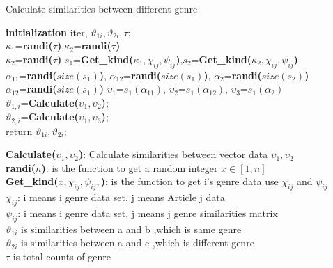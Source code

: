 \documentclass{article}
\begin{document}

\begin{algorithm}[H]
    \caption{Calculate similarities between different genre} %
    \textbf{initialization} iter, $\vartheta_{1i}, \vartheta_{2i}, \tau$; \\
    {
        $\kappa_{1}$=\textbf{randi($\tau$)},$\kappa_{2}$=\textbf{randi($\tau$)}\\
        {
            $\kappa_{2}$=\textbf{randi($\tau$)}
        }
        $s_{1}$=\textbf{Get\_kind($\kappa_{1},\chi_{ij},\psi_{ij}$)},$s_{2}$=\textbf{Get\_kind($\kappa_{2},\chi_{ij},\psi_{ij}$)}\\
        $\alpha_{11}$=\textbf{randi($size(s_{1})$)},
        $\alpha_{12}$=\textbf{randi($size(s_{1})$)},
        $\alpha_{2}$=\textbf{randi($size(s_{2})$)}\\
        {
            $\alpha_{12}$=\textbf{randi($size(s_{1})$)}
        }
        $\upsilon_{1}$=$s_{1}(\alpha_{11})$,
        $\upsilon_{2}$=$s_{1}(\alpha_{12})$,
        $\upsilon_{3}$=$s_{1}(\alpha_{2})$ \\
        $\vartheta_{1,i}$=\textbf{Calculate($\upsilon_{1},\upsilon_{2}$)};\\
        $\vartheta_{2,i}$=\textbf{Calculate($\upsilon_{1},\upsilon_{3}$)};\\
    }
    return $\vartheta_{1i}, \vartheta_{2i}$; \\
\end{algorithm}

\textbf{Calculate($\upsilon_{1},\upsilon_{2}$)}: Calculate similarities between vector data $\upsilon_{1},\upsilon_{2}$\\
\textbf{randi($n$)}: is the function to get a random integer $x \in [1,n]$\\
\textbf{Get\_kind($x,\chi_{ij},\psi_{ij},$)}: is the function to get i's genre data use $\chi_{ij}$ and $\psi_{ij}$\\
$\chi_{ij}$: i means i genre data set, j means Article j data\\
$\psi_{ij}$: i means i genre data set, j means j genre similarities matrix\\
$\vartheta_{1i}$ is similarities between a and b ,which is same genre\\
$\vartheta_{2i}$ is similarities between a and c ,which is different genre\\
$\tau$ is total counts of genre
\end{document}
